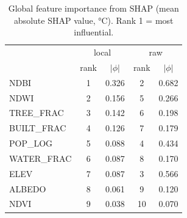 \begin{table}[t]
\centering
\caption{Global feature importance from SHAP (mean absolute SHAP value, °C). Rank 1 = most influential.}
\label{tab:shap}
\begin{tabular}{lcccc}
\toprule
& \multicolumn{2}{c}{local} & \multicolumn{2}{c}{raw} \\
& rank & $|\phi|$ & rank & $|\phi|$ \\
\midrule
NDBI & 1 & 0.326 & 2 & 0.682 \\
NDWI & 2 & 0.156 & 5 & 0.266 \\
TREE_FRAC & 3 & 0.142 & 6 & 0.198 \\
BUILT_FRAC & 4 & 0.126 & 7 & 0.179 \\
POP_LOG & 5 & 0.088 & 4 & 0.434 \\
WATER_FRAC & 6 & 0.087 & 8 & 0.170 \\
ELEV & 7 & 0.087 & 3 & 0.566 \\
ALBEDO & 8 & 0.061 & 9 & 0.120 \\
NDVI & 9 & 0.038 & 10 & 0.070 \\
\bottomrule
\end{tabular}
\end{table}
